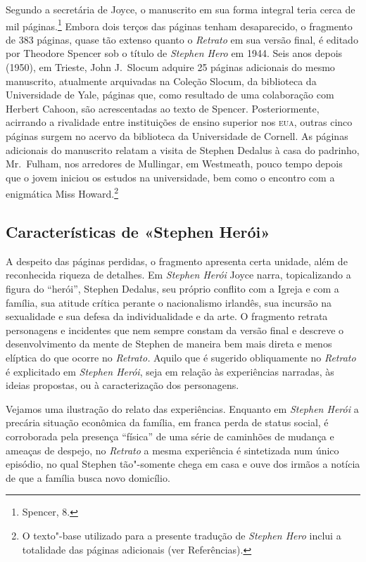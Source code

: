 Segundo a secretária de Joyce, o manuscrito em sua forma integral teria
cerca de mil páginas.\footnote{ Spencer, 8.} Embora dois terços das páginas
tenham desaparecido, o fragmento de 383 páginas, quase tão extenso
quanto o \textit{Retrato} em sua versão final, é editado por Theodore
Spencer sob o título de \textit{Stephen Hero} em 1944.  
Seis anos depois (1950), em Trieste, John J.~Slocum adquire
25 páginas adicionais do mesmo manuscrito, atualmente
arquivadas na Coleção Slocum, da biblioteca da Universidade de Yale,
páginas que, como resultado de uma colaboração com Herbert Cahoon, são
acrescentadas ao texto de Spencer.  Posteriormente, acirrando a
rivalidade entre instituições de ensino superior nos \textsc{eua}, outras cinco
páginas surgem no acervo da biblioteca da Universidade de Cornell.  As
páginas adicionais do manuscrito relatam a visita de Stephen Dedalus à
casa do padrinho, Mr.~Fulham, nos arredores de Mullingar, em Westmeath,
pouco tempo depois que o jovem iniciou os estudos na universidade, bem
como o encontro com a enigmática Miss Howard.\footnote{ O texto"-base
utilizado para a presente tradução de \textit{Stephen Hero} inclui a
totalidade das páginas adicionais (ver Referências).}


\subsection*{Características de «Stephen Herói»}

A despeito das páginas perdidas, o fragmento apresenta certa unidade,
além de reconhecida riqueza de detalhes.  Em \textit{Stephen Herói}
Joyce narra, topicalizando a figura do “herói”, Stephen Dedalus, seu
próprio conflito com a Igreja e com a família, sua atitude crítica
perante o nacionalismo irlandês, sua incursão na sexualidade e sua
defesa da individualidade e da arte.  O fragmento
retrata personagens e incidentes que nem sempre constam da versão final
e descreve o desenvolvimento da mente de Stephen de maneira bem mais
direta e menos elíptica do que ocorre no \textit{Retrato.}  Aquilo
que é sugerido obliquamente no \textit{Retrato} é explicitado em
\textit{Stephen Herói}, seja em relação às experiências narradas, às
ideias propostas, ou à caracterização dos personagens.

Vejamos uma ilustração do relato das experiências.  Enquanto em
\textit{Stephen Herói} a precária situação econômica da família, em
franca perda de status social, é corroborada pela presença “física” de
uma série de caminhões de mudança e ameaças de despejo, no		
\textit{Retrato} a mesma experiência é sintetizada num único episódio,
no qual Stephen tão"-somente chega em casa e ouve dos irmãos a notícia
de que a família busca novo domicílio.

